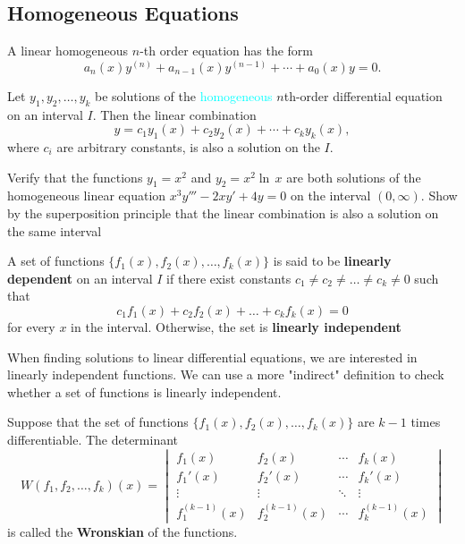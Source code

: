 \subsection{Homogeneous Equations}
  A linear homogeneous $n$-th order equation has the form
  \[
  a_n(x) y^{(n)} + a_{n-1}(x) y^{(n-1)} + \cdots + a_0(x) y = 0.
  \]


\begin{theorem}
 Let \(y_1,y_2,\ldots,y_k\) be solutions of the \textcolor{cyan}{homogeneous} \(n\)th-order differential equation on an interval \(I\).
  Then the linear combination 
  \[
  y = c_1y_1(x) + c_2y_2(x) + \cdots + c_ky_k(x),
  \]
  where \(c_i\) are arbitrary constants, is also a solution on the \(I\).
\end{theorem}



\begin{example}
  Verify that the functions \(y_1 = x^2\) and \(y_2=x^2\ln\,x\) are both solutions of the homogeneous linear equation
  \(x^3y''' - 2xy' + 4y =0\) on the interval \((0, \infty)\).
  Show by the superposition principle that the linear combination is also a solution on the same interval
\end{example}



\begin{definition}
  A set of functions \(\{f_1(x),f_2(x),\ldots,f_k(x)\}\) is said to be \textbf{linearly dependent} on an interval \(I\) if there exist constants
   \(c_1\neq c_2 \neq \ldots \neq c_k \neq 0\) such that
   \[
   c_1f_1(x) + c_2f_2(x) + \ldots + c_kf_k(x) = 0
   \]
   for every \(x\) in the interval.
   Otherwise, the set is \textbf{linearly independent}
\end{definition}

When finding solutions to linear differential equations, we are interested in linearly independent functions.
We can use a more "indirect" definition to check whether a set of functions is linearly independent.


\begin{definition}[Wronskian]
  Suppose that the set of functions \(\{f_1(x),f_2(x),\ldots,f_k(x)\}\) are \(k-1\) times differentiable.
  The determinant
  \[
    W(f_1, f_2, \dots, f_k)(x) =
    \begin{vmatrix}
    f_1(x) & f_2(x) & \cdots & f_k(x) \\
    f_1'(x) & f_2'(x) & \cdots & f_k'(x) \\
    \vdots & \vdots & \ddots & \vdots \\
    f_1^{(k-1)}(x) & f_2^{(k-1)}(x) & \cdots & f_k^{(k-1)}(x)
    \end{vmatrix}
  \]
  is called the \textbf{Wronskian} of the functions.
\end{definition}


